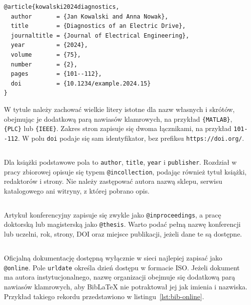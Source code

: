 \begin{lstlisting}[style=thesis,caption={Przykładowy rekord artykułu naukowego z numerem DOI},label={lst:bib-artykul}]
@article{kowalski2024diagnostics,
  author       = {Jan Kowalski and Anna Nowak},
  title        = {Diagnostics of an Electric Drive},
  journaltitle = {Journal of Electrical Engineering},
  year         = {2024},
  volume       = {75},
  number       = {2},
  pages        = {101--112},
  doi          = {10.1234/example.2024.15}
}
\end{lstlisting}

W tytule należy zachować wielkie litery istotne dla nazw własnych i skrótów, obejmując je dodatkową parą nawiasów klamrowych, na przykład \verb|{MATLAB}|, \verb|{PLC}| lub \verb|{IEEE}|. Zakres stron zapisuje się dwoma łącznikami, na przykład \verb|101--112|. W polu \texttt{doi} podaje się sam identyfikator, bez prefiksu \texttt{https://doi.org/}.

\subsection{}

Dla książki podstawowe pola to \texttt{author}, \texttt{title}, \texttt{year} i \texttt{publisher}. Rozdział w pracy zbiorowej opisuje się typem \texttt{@incollection}, podając również tytuł książki, redaktorów i strony. Nie należy zastępować autora nazwą sklepu, serwisu katalogowego ani witryny, z której pobrano opis.

\subsection{}

Artykuł konferencyjny zapisuje się zwykle jako \texttt{@inproceedings}, a pracę doktorską lub magisterską jako \texttt{@thesis}. Warto podać pełną nazwę konferencji lub uczelni, rok, strony, DOI oraz miejsce publikacji, jeżeli dane te są dostępne.

\subsection{}

Oficjalną dokumentację dostępną wyłącznie w sieci najlepiej zapisać jako \texttt{@online}. Pole \texttt{urldate} określa dzień dostępu w formacie ISO. Jeżeli dokument ma autora instytucjonalnego, nazwę organizacji obejmuje się dodatkową parą nawiasów klamrowych, aby BibLaTeX nie potraktował jej jak imienia i nazwiska. Przykład takiego rekordu przedstawiono w listingu~\ref{lst:bib-online}.

